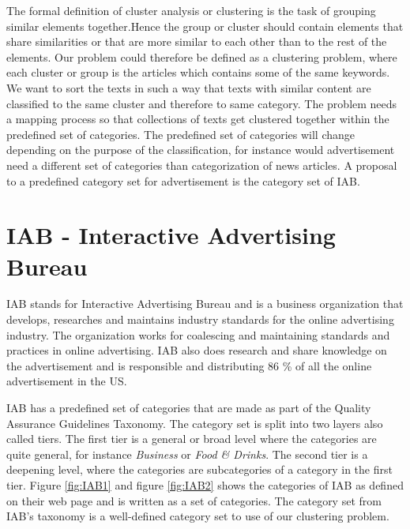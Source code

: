 \documentclass[english,a4paper]{ifimaster}
\begin{document}
The formal definition of cluster analysis or clustering is the task of grouping similar elements together.Hence the group or cluster should contain elements that share similarities or that are more similar to each other than to the rest of the elements. %
Our problem could therefore be defined as a clustering problem, where each cluster or group is the articles which contains some of the same keywords. We want to sort the texts in such a way that texts with similar content are classified to the same cluster and therefore to same category. The problem needs a mapping process so that collections of texts get clustered together within the predefined set of categories. The predefined set of categories will change depending on the purpose of the classification, for instance would advertisement need a different set of categories than categorization of news articles. A proposal to a predefined category set for advertisement is the category set of IAB. 

\chapter{IAB - Interactive Advertising Bureau}


IAB stands for Interactive Advertising Bureau and is a business organization that develops, researches and maintains industry standards for the online advertising industry. The organization works for coalescing and maintaining standards and practices in online advertising. IAB also does research and share knowledge on the advertisement and is responsible and distributing 86 \% of all the online advertisement in the US. \cite{IABabout}

IAB has a predefined set of categories that are made as part of the Quality Assurance Guidelines Taxonomy. The category set is split into two layers also called tiers. The first tier is a general or broad level where the categories are quite general, for instance \textit{Business} or \textit{Food \& Drinks}. The second tier is a deepening level, where the categories are subcategories of a category in the first tier.
Figure \ref{fig:IAB1} and figure \ref{fig:IAB2}
shows the categories of IAB as defined on their web page and is written as a set of categories. The category set from IAB's taxonomy is a well-defined category set to use of our clustering problem.  
\end{document}
